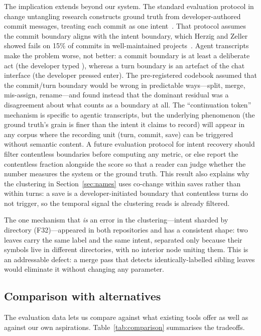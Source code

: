 The implication extends beyond our system. The standard evaluation protocol in
change untangling research constructs ground truth from developer-authored commit
messages, treating each commit as one intent~\cite{herzig2013,dias2015}. That
protocol assumes the commit boundary aligns with the intent boundary, which
Herzig and Zeller showed fails on 15\% of commits in well-maintained
projects~\cite{herzig2013}. Agent transcripts make the problem worse, not better:
a commit boundary is at least a deliberate act (the developer typed ), whereas a turn boundary is an artefact of the chat interface (the
developer pressed enter). The pre-registered codebook assumed that the
commit/turn boundary would be wrong in predictable ways---split, merge,
mis-assign, rename---and found instead that the dominant residual was a
disagreement about what counts as a boundary at all. The ``continuation token''
mechanism is specific to agentic transcripts, but the underlying phenomenon
(the ground truth's grain is finer than the intent it claims to record) will
appear in any corpus where the recording unit (turn, commit, save) can be
triggered without semantic content. A future evaluation protocol for intent
recovery should filter contentless boundaries before computing any metric,
or else report the contentless fraction alongside the score so that a reader
can judge whether the number measures the system or the ground truth.
This result also explains why the clustering in Section~\ref{sec:names} uses
co-change within saves rather than within turns: a save is a developer-initiated
boundary that contentless turns do not trigger, so the temporal signal the
clustering reads is already filtered.

The one mechanism that \emph{is} an error in the clustering---intent sharded by
directory (F32)---appeared in both repositories and has a consistent shape: two
leaves carry the same label and the same intent, separated only because their
symbols live in different directories, with no interior node uniting them.
This is an addressable defect: a merge pass that detects identically-labelled
sibling leaves would eliminate it without changing any parameter.

\subsection{Comparison with alternatives}
\label{sec:comparison}

The evaluation data lets us compare against what existing tools offer as
well as against our own aspirations. Table~\ref{tab:comparison} summarises the
tradeoffs.

